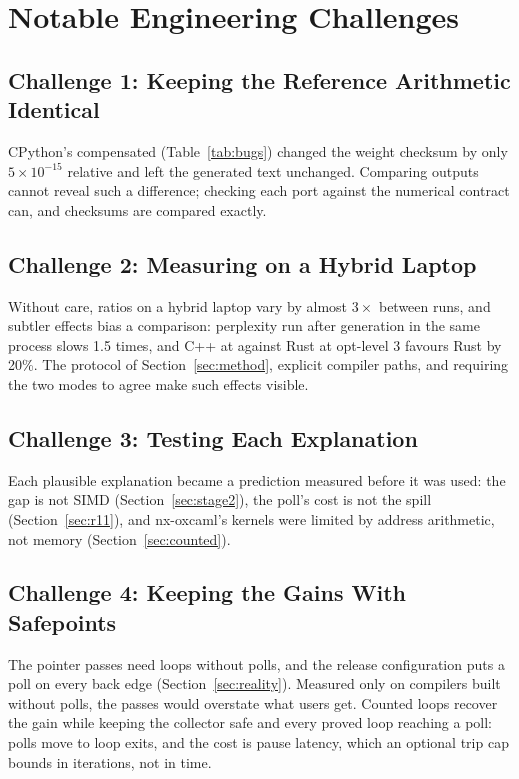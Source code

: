 \section{Notable Engineering Challenges}
\label{sec:challenges}

\subsection{Challenge 1: Keeping the Reference Arithmetic Identical}
CPython's compensated  (Table~\ref{tab:bugs}) changed the weight
checksum by only $5\times10^{-15}$ relative and left the generated text
unchanged. Comparing outputs cannot reveal such a difference; checking each
port against the numerical contract can, and checksums are compared exactly.

\subsection{Challenge 2: Measuring on a Hybrid Laptop}
Without care, ratios on a hybrid laptop vary by almost $3\times$ between runs,
and subtler effects bias a comparison: perplexity run after generation in the
same process slows 1.5 times, and C++ at  against Rust at opt-level
3 favours Rust by 20\%. The protocol of Section~\ref{sec:method}, explicit
compiler paths, and requiring the two modes to agree make such effects
visible.

\subsection{Challenge 3: Testing Each Explanation}
Each plausible explanation became a prediction measured before it was used:
the gap is not SIMD (Section~\ref{sec:stage2}), the poll's cost is not the
 spill (Section~\ref{sec:r11}), and nx-oxcaml's kernels were limited
by address arithmetic, not memory (Section~\ref{sec:counted}).

\subsection{Challenge 4: Keeping the Gains With Safepoints}
The pointer passes need loops without polls, and the release configuration
puts a poll on every back edge (Section~\ref{sec:reality}). Measured only on
compilers built without polls, the passes would overstate what users get.
Counted loops recover the gain while keeping the collector safe and every
proved loop reaching a poll: polls move to loop exits, and the cost is pause
latency, which an optional trip cap bounds in iterations, not in time.


